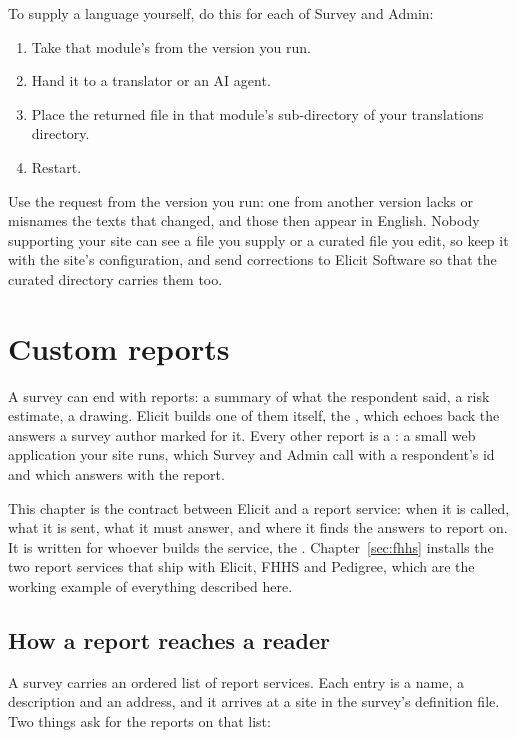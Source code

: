 \documentclass[11pt, a4paper]{article}
\begin{document}
To supply a language yourself, do this for each of Survey and Admin:
\begin{enumerate}
  \item Take that module's  from the version you run.
  \item Hand it to a translator or an AI agent.
  \item Place the returned file in that module's sub-directory of your translations directory.
  \item Restart.
\end{enumerate}
Use the request from the version you run: one from another version lacks or misnames the texts
that changed, and those then appear in English. Nobody supporting your site can see a file you
supply or a curated file you edit, so keep it with the site's configuration, and send
corrections to Elicit Software so that the curated directory carries them too.

\section{Custom reports}
\label{sec:reports}

A survey can end with reports: a summary of what the respondent said, a risk estimate, a
drawing. Elicit builds one of them itself, the , which echoes back the
answers a survey author marked for it. Every other report is a : a small
web application your site runs, which Survey and Admin call with a respondent's id and which
answers with the report.

This chapter is the contract between Elicit and a report service: when it is called, what it
is sent, what it must answer, and where it finds the answers to report on. It is written for
whoever builds the service, the . Chapter~\ref{sec:fhhs} installs the
two report services that ship with Elicit, FHHS and Pedigree, which are the working example of
everything described here.

\subsection{How a report reaches a reader}

A survey carries an ordered list of report services. Each entry is a name, a description and
an address, and it arrives at a site in the survey's definition file. Two things ask for the
reports on that list:
\end{document}
